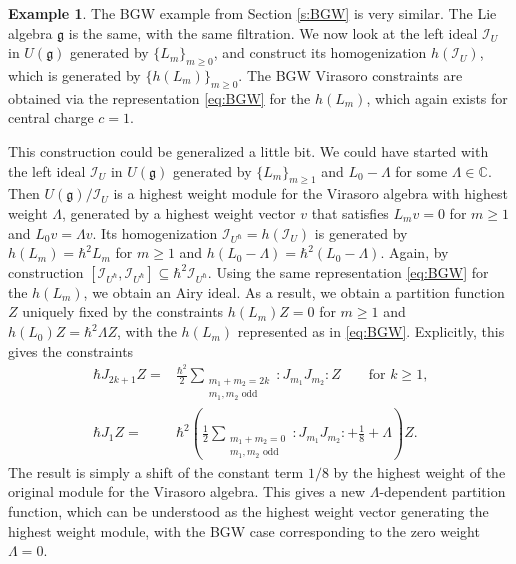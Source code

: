 \documentclass[reqno,oneside,11pt]{amsart}
\theoremstyle{plain}
\theoremstyle{definition}
\newtheorem{example}[theorem]{Example}
\theoremstyle{remark}
\numberwithin{equation}{section}
\begin{document}
\begin{example}
The BGW example from Section \ref{s:BGW} is very similar. The Lie algebra $\mathfrak{g}$ is the same, with the same filtration. We now look at the left ideal $\mathcal{I}_U$ in $U(\mathfrak{g})$ generated by $\{L_m \}_{m \geq 0}$, and construct its homogenization $h(\mathcal{I}_U)$, which is generated by $\{ h(L_m) \}_{m \geq 0}$. The BGW Virasoro constraints are obtained via the representation \eqref{eq:BGW} for the $h(L_m)$, which again exists for central charge $c=1$.

This construction could be generalized a little bit. We could have started with the left ideal $\mathcal{I}_U$ in $U(\mathfrak{g})$ generated by $\{L_m\}_{m \geq 1}$ and $L_0 - \Lambda$ for some $\Lambda \in \mathbb{C}$. Then $U(\mathfrak{g})/ \mathcal{I}_U$ is a highest weight module for the Virasoro algebra with highest weight $\Lambda$, generated by a highest weight vector $v$ that satisfies $L_m v =0$ for $m \geq 1$ and $L_0 v = \Lambda v$. Its homogenization $\mathcal{I}_{U^\hbar}=h(\mathcal{I}_U)$ is generated by $h(L_m) = \hbar^2 L_m$ for $m \geq 1$ and $h(L_0 - \Lambda) = \hbar^2(L_0 - \Lambda)$. Again, by construction $[\mathcal{I}_{U^\hbar}, \mathcal{I}_{U^\hbar}] \subseteq \hbar^2 \mathcal{I}_{U^\hbar}$. Using the same representation \eqref{eq:BGW} for the $h(L_m)$, we obtain an Airy ideal. As a result, we obtain a partition function $Z$ uniquely fixed by the constraints  $h(L_m) Z = 0$ for $ m\geq 1$ and $h(L_0) Z = \hbar^2 \Lambda Z$, with the $h(L_m)$ represented as in \eqref{eq:BGW}. Explicitly, this gives the constraints
\begin{align}
 \hbar J_{2k+1} Z =& \frac{\hbar^2}{2}\sum_{\substack{m_1+m_2 =2 k\\ m_1, m_2 \text{ odd}}} : J_{m_1} J_{m_2}:  Z \qquad \text{for $k \geq 1$,}\\
 \hbar J_1 Z =& \hbar^2 \left(\frac{1}{2}\sum_{\substack{m_1+m_2 =0\\ m_1, m_2 \text{ odd}}} : J_{m_1} J_{m_2}:+ \frac{1}{8} + \Lambda \right) Z.
\end{align}
The result is simply a shift of the constant term $1/8$ by the highest weight of the original module for the Virasoro algebra. This gives a new $\Lambda$-dependent partition function, which can be understood as the highest weight vector generating the highest weight module, with the BGW case corresponding to the zero weight $\Lambda=0$.
\end{example}
\end{document}
